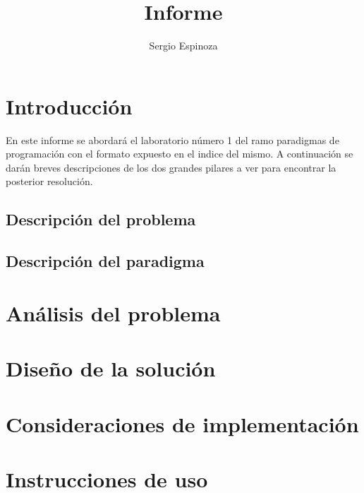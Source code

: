 \documentclass[10pt,letterpaper,openany]{article}
\title{Informe}
\author{Sergio Espinoza}
\begin{document}
    
    
    
    \tableofcontents
    \listoftables
    \newpage


    
    \section{Introducción}
    En este informe se abordará el laboratorio número 1 del ramo paradigmas de programación
    con el formato expuesto en el indice del mismo. A continuación se darán breves descripciones
    de los dos grandes pilares a ver para encontrar la posterior resolución.  
        \subsection{Descripción del problema}
            
        \subsection{Descripción del paradigma}
            


    \section{Análisis del problema}
        

    \section{Diseño de la solución}
        

    \section{Consideraciones de implementación}
        

    \section{Instrucciones de uso}
        
\end{document}
